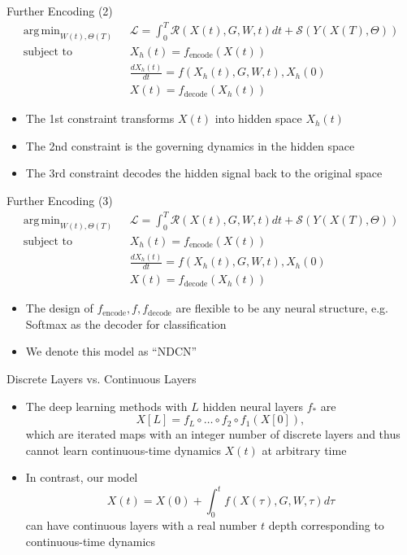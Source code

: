 \documentclass{beamer}
\DeclareMathOperator*{\argmin}{arg\,min}
\begin{document}
\begin{frame}{Further Encoding (2)}
\[
\begin{split}
\argmin_{W(t),\Theta(T)}\text{ }&\mathcal{L}=\int_0^T\mathcal{R}\left(X(t),G,W,t\right)dt+\mathcal{S}\left(Y(X(T),\Theta)\right)\\
\text{subject to }&X_h(t)=f_\text{encode}(X(t))\\
&\frac{dX_h(t)}{dt}=f(X_h(t),G,W,t),X_h(0)\\
&X(t)=f_\text{decode}(X_h(t))
\end{split}
\]
\begin{itemize}
\item The 1st constraint transforms $X(t)$ into hidden space $X_h(t)$
\item The 2nd constraint is the governing dynamics in the hidden space
\item The 3rd constraint decodes the hidden signal back to the original space
\end{itemize}
\end{frame}

\begin{frame}{Further Encoding (3)}
\[
\begin{split}
\argmin_{W(t),\Theta(T)}\text{ }&\mathcal{L}=\int_0^T\mathcal{R}\left(X(t),G,W,t\right)dt+\mathcal{S}\left(Y(X(T),\Theta)\right)\\
\text{subject to }&X_h(t)=f_\text{encode}(X(t))\\
&\frac{dX_h(t)}{dt}=f(X_h(t),G,W,t),X_h(0)\\
&X(t)=f_\text{decode}(X_h(t))
\end{split}
\]
\begin{itemize}
\item The design of $f_\text{encode}, f, f_\text{decode}$ are flexible to be any neural structure, e.g. Softmax as the decoder for classification
\item We denote this model as ``NDCN''
\end{itemize}
\end{frame}

\begin{frame}{Discrete Layers vs. Continuous Layers}
\begin{itemize}
\item The deep learning methods with $L$ hidden neural layers $f_*$ are\[
X[L]=f_L\circ\dots\circ f_2\circ f_1(X[0]),
\]which are iterated maps with an integer number of discrete layers and thus cannot learn continuous-time dynamics $X(t)$ at arbitrary time
\item In contrast, our model\[
X(t)=X(0)+\int_0^t f(X(\tau),G,W,\tau)d\tau
\]can have continuous layers with a real number $t$ depth corresponding to continuous-time dynamics
\end{itemize}
\end{frame}
\end{document}
